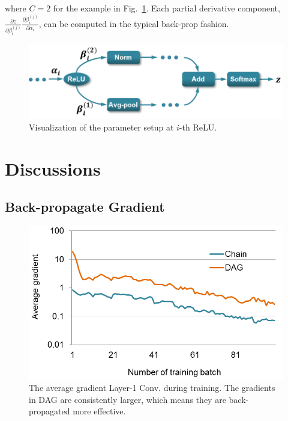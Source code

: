\documentclass[10pt,twocolumn,letterpaper]{article}
\begin{document}
\noindent where $C=2$ for the example in Fig.~\ref{fig:backprop_eq}. Each partial derivative component, $\frac{\partial z}{\partial \beta_i^{(j)}}\frac{\partial \beta_i^{(j)}}{\partial \alpha_i}$, can be computed in the typical back-prop fashion. 


\begin{figure}[htbp]
\centering
	\includegraphics[width=\columnwidth]{fig/fig_backprop_eq.png}
\caption{Visualization of the parameter setup at $i$-th ReLU.}

\label{fig:backprop_eq}
\end{figure}


\section{Discussions\label{sec:ana}}

\subsection{Back-propagate Gradient}

\begin{figure}[htbp]
\centering
	\includegraphics[width=.8\columnwidth]{fig/fig_grad.png}
\caption{The average gradient Layer-1 Conv. during training. The gradients in DAG are consistently larger, which means they are back-propagated more effective.}

\label{fig:grad}
\end{figure}
\end{document}
